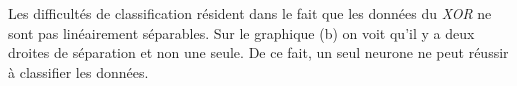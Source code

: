\documentclass[a4paper,french,10pt]{article}
\begin{document}
	\begin{figure}[htp] 
		\centering
		\hfill%
		\hfill%
	\end{figure}
	Les difficultés de classification résident dans le fait que les données du \textit{XOR} ne sont pas linéairement séparables. Sur le graphique (b) on voit qu'il y a deux droites de séparation et non une seule. De ce fait, un seul neurone ne peut réussir à classifier les données.
	
\end{document}
